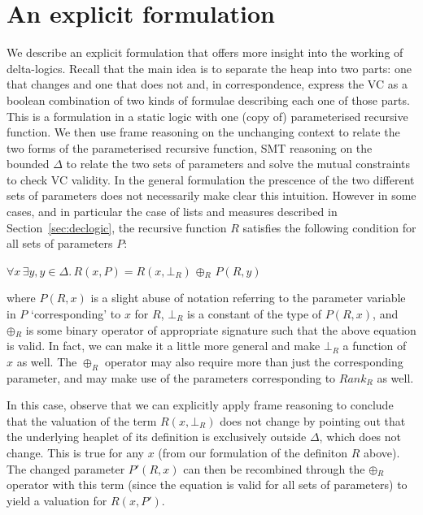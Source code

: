\section{An explicit formulation}
\label{sec:oplus}
We describe an explicit formulation that offers more insight into the working of delta-logics. Recall that the main idea is to separate the heap into two parts: one that changes and one that does not and, in correspondence, express the VC as a boolean combination of two kinds of formulae describing each one of those parts. This is a formulation in a static logic with one (copy of) parameterised recursive function. We then use frame reasoning on the unchanging context to relate the two forms of the parameterised recursive function, SMT reasoning on the bounded $\Delta{}$ to relate the two sets of parameters and solve the mutual constraints to check VC validity. In the general formulation the prescence of the two different sets of parameters does not necessarily make clear this intuition. However in some cases, and in particular the case of lists and measures described in Section~\ref{sec:declogic}, the recursive function $R$ satisfies the following condition for all sets of parameters $P$:
\begin{center}
$\forall{}x\,\exists{} y, y \in{} \Delta{}.\, R(x, P) = R(x, \bot_{R})$ $\oplus{}_R$ $P(R,y)$ 
\end{center}
where $P(R, x)$ is a slight abuse of notation referring to the parameter variable in $P$ `corresponding' to $x$ for $R$, $\bot_{R}$ is a constant of the type of $P(R, x)$, and $\oplus{}_{R}$ is some binary operator of appropriate signature such that the above equation is valid. In fact, we can make it a little more general and make $\bot_{R}$ a function of $x$ as well. The $\oplus_{R}$ operator may also require more than just the corresponding parameter, and may make use of the parameters corresponding to $Rank_{R}$ as well.

In this case, observe that we can explicitly apply frame reasoning to conclude that the valuation of the term $R(x, \bot_{R})$ does not change by pointing out that the underlying heaplet of its definition is exclusively outside $\Delta{}$, which does not change. This is true for any $x$ (from our formulation of the definiton $R$ above). The changed parameter $P'(R, x)$ can then be recombined through the $\oplus{}_{R}$ operator with this term (since the equation is valid for all sets of parameters) to yield a valuation for $R(x, P')$.

